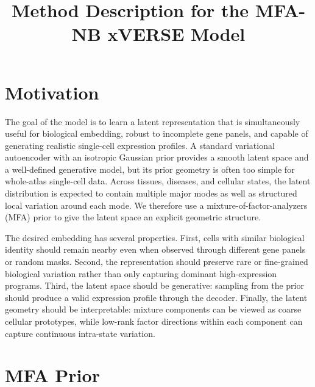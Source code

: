 \documentclass[11pt]{article}
\title{Method Description for the MFA-NB xVERSE Model}
\author{}
\date{}
\begin{document}
\maketitle

\section{Motivation}

The goal of the model is to learn a latent representation that is simultaneously useful for biological embedding, robust to incomplete gene panels, and capable of generating realistic single-cell expression profiles. A standard variational autoencoder with an isotropic Gaussian prior provides a smooth latent space and a well-defined generative model, but its prior geometry is often too simple for whole-atlas single-cell data. Across tissues, diseases, and cellular states, the latent distribution is expected to contain multiple major modes as well as structured local variation around each mode. We therefore use a mixture-of-factor-analyzers (MFA) prior to give the latent space an explicit geometric structure.

The desired embedding has several properties. First, cells with similar biological identity should remain nearby even when observed through different gene panels or random masks. Second, the representation should preserve rare or fine-grained biological variation rather than only capturing dominant high-expression programs. Third, the latent space should be generative: sampling from the prior should produce a valid expression profile through the decoder. Finally, the latent geometry should be interpretable: mixture components can be viewed as coarse cellular prototypes, while low-rank factor directions within each component can capture continuous intra-state variation.

\section{MFA Prior}
\end{document}
